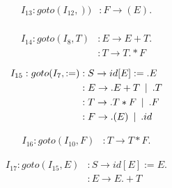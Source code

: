 \documentclass{article}
\newcommand\tab[1][5pt]{\hspace*{#1}}
\newcommand\sep{\tab | \tab }
\begin{document}
\begin{figure}[h!]
\begin{multicols}{2}
\begin{equation*}
\begin{aligned}
I_{13} : goto(I_{12},)) &: F \rightarrow (E).  \\
\end{aligned}
\end{equation*}


\begin{equation*}
\begin{aligned}
I_{14} : goto(I_8,T) &: E \rightarrow E+T.  \\
&: T \rightarrow T.*F
\end{aligned}
\end{equation*}

\begin{equation*}
\begin{aligned}
I_{15} : goto(I_7,:=) &: S \rightarrow id[E] := .E  \\
&: E \rightarrow .E+T \tab | \tab .T \\
&: T \rightarrow .T*F \tab | \tab  .F \\
&: F \rightarrow .(E) \sep .id \\
\end{aligned}
\end{equation*}

\begin{equation*}
\begin{aligned}
I_{16} : goto(I_{10},F) &: T \rightarrow T*F.
\end{aligned}
\end{equation*}


\begin{equation*}
\begin{aligned}
I_{17} : goto(I_{15},E) &: S \rightarrow id[E] := E. \\
&: E \rightarrow E.+T \\
\end{aligned}
\end{equation*}


\end{multicols}
\end{figure}
\end{document}
